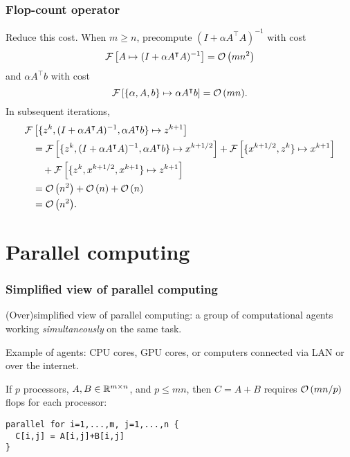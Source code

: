 \documentclass[10pt,mathserif]{beamer}
\begin{document}
\begin{frame}
\frametitle{Flop-count operator}
Reduce this cost.
When $m\ge n$, precompute $(I+\alpha A^\intercal A)^{-1}$ with cost
\[
\mathcal{F}\left[
A\mapsto (I+\alpha A^\intercal A)^{-1}
\right]={\mathcal{O}\left(mn^2\right)}
\]
and $\alpha A^\intercal b$ with cost
\[
\mathcal{F}\left[
\{\alpha, A,b\}\mapsto \alpha A^\intercal b
\right]={\mathcal{O}\left(mn\right)}.
\]
\pause 
In subsequent iterations,
\begin{align*}
\mathcal{F}&\left[\{z^k,(I+\alpha A^\intercal A)^{-1},\alpha A^\intercal b\}\mapsto z^{k+1}\right]\\&=
\mathcal{F}\left[\{z^k,(I+\alpha A^\intercal A)^{-1},\alpha A^\intercal b\}\mapsto x^{k+1/2}\right]
+
\mathcal{F}\left[\{x^{k+1/2},z^k\}\mapsto x^{k+1}\right]\\
&\quad+
\mathcal{F}\left[\{z^k,x^{k+1/2},x^{k+1}\}\mapsto z^{k+1}\right]\\
&={\mathcal{O}\left(n^2\right)}
+{\mathcal{O}\left(n\right)}+{\mathcal{O}\left(n\right)}\\
&={\mathcal{O}\left(n^2\right)}.
\end{align*}
\end{frame}






\section{Parallel computing}
\begin{frame}[fragile]
\frametitle{Simplified view of parallel computing}
(Over)simplified view of parallel computing: a group of computational agents working \emph{simultaneously} on the same task.
\medskip

Example of agents: CPU cores, GPU cores, or computers connected via LAN or over the internet.


\vspace{0.2in}\pause


If $p$ processors, $A,B\in \mathbb{R}^{m\times n}$, and $p\le mn$, then $C=A+B$ requires ${\mathcal{O}\left(mn/p\right)}$ flops for each processor:
\begin{lstlisting}
parallel for i=1,...,m, j=1,...,n {
  C[i,j] = A[i,j]+B[i,j]
}
\end{lstlisting}
\end{frame}
\end{document}
